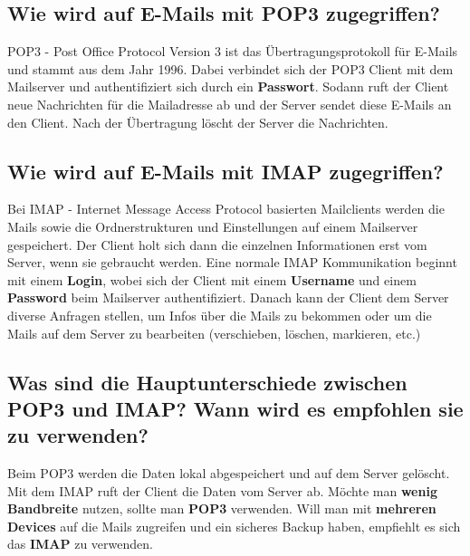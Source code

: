 \subsection*{Wie wird auf E-Mails mit POP3 zugegriffen?}
POP3 - Post Office Protocol Version 3 ist das Übertragungsprotokoll für E-Mails und stammt aus dem Jahr 1996. Dabei verbindet sich der POP3 Client mit dem Mailserver und authentifiziert sich durch ein \textbf{Passwort}. Sodann ruft der Client neue Nachrichten für die Mailadresse ab und der Server sendet diese E-Mails an den Client. Nach der Übertragung löscht der Server die Nachrichten.

\subsection*{Wie wird auf E-Mails mit IMAP zugegriffen?}
Bei IMAP - Internet Message Access Protocol basierten Mailclients werden die Mails sowie die Ordnerstrukturen und Einstellungen auf einem Mailserver gespeichert. Der Client holt sich dann die einzelnen Informationen erst vom Server, wenn sie gebraucht werden. Eine normale IMAP Kommunikation beginnt mit einem \textbf{Login}, wobei sich der Client mit einem \textbf{Username} und einem \textbf{Password} beim Mailserver authentifiziert. Danach kann der Client dem Server diverse Anfragen stellen, um Infos über die Mails zu bekommen oder um die Mails auf dem Server zu bearbeiten (verschieben, löschen, markieren, etc.)

\subsection*{Was sind die Hauptunterschiede zwischen POP3 und IMAP? Wann wird es empfohlen sie zu verwenden? }
Beim POP3 werden die Daten lokal abgespeichert und auf dem Server gelöscht. Mit dem IMAP ruft der Client die Daten vom Server ab. Möchte man \textbf{wenig Bandbreite} nutzen, sollte man \textbf{POP3} verwenden. Will man mit \textbf{mehreren Devices} auf die Mails zugreifen und ein sicheres Backup haben, empfiehlt es sich das \textbf{IMAP} zu verwenden.


